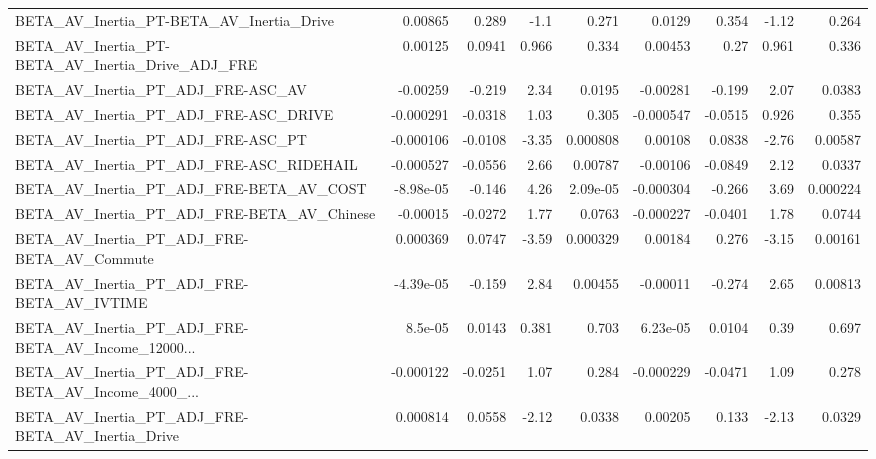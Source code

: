 \begin{tabular}{lrrrrrrrr}
BETA\_AV\_Inertia\_PT-BETA\_AV\_Inertia\_Drive           &     0.00865 &        0.289 &     -1.1 &    0.271 &     0.0129 &       0.354 &        -1.12 &         0.264 \\
BETA\_AV\_Inertia\_PT-BETA\_AV\_Inertia\_Drive\_ADJ\_FRE   &     0.00125 &       0.0941 &    0.966 &    0.334 &    0.00453 &        0.27 &        0.961 &         0.336 \\
BETA\_AV\_Inertia\_PT\_ADJ\_FRE-ASC\_AV                  &    -0.00259 &       -0.219 &     2.34 &   0.0195 &   -0.00281 &      -0.199 &         2.07 &        0.0383 \\
BETA\_AV\_Inertia\_PT\_ADJ\_FRE-ASC\_DRIVE               &   -0.000291 &      -0.0318 &     1.03 &    0.305 &  -0.000547 &     -0.0515 &        0.926 &         0.355 \\
BETA\_AV\_Inertia\_PT\_ADJ\_FRE-ASC\_PT                  &   -0.000106 &      -0.0108 &    -3.35 & 0.000808 &    0.00108 &      0.0838 &        -2.76 &       0.00587 \\
BETA\_AV\_Inertia\_PT\_ADJ\_FRE-ASC\_RIDEHAIL            &   -0.000527 &      -0.0556 &     2.66 &  0.00787 &   -0.00106 &     -0.0849 &         2.12 &        0.0337 \\
BETA\_AV\_Inertia\_PT\_ADJ\_FRE-BETA\_AV\_COST            &   -8.98e-05 &       -0.146 &     4.26 & 2.09e-05 &  -0.000304 &      -0.266 &         3.69 &      0.000224 \\
BETA\_AV\_Inertia\_PT\_ADJ\_FRE-BETA\_AV\_Chinese         &    -0.00015 &      -0.0272 &     1.77 &   0.0763 &  -0.000227 &     -0.0401 &         1.78 &        0.0744 \\
BETA\_AV\_Inertia\_PT\_ADJ\_FRE-BETA\_AV\_Commute         &    0.000369 &       0.0747 &    -3.59 & 0.000329 &    0.00184 &       0.276 &        -3.15 &       0.00161 \\
BETA\_AV\_Inertia\_PT\_ADJ\_FRE-BETA\_AV\_IVTIME          &   -4.39e-05 &       -0.159 &     2.84 &  0.00455 &   -0.00011 &      -0.274 &         2.65 &       0.00813 \\
BETA\_AV\_Inertia\_PT\_ADJ\_FRE-BETA\_AV\_Income\_12000... &     8.5e-05 &       0.0143 &    0.381 &    0.703 &   6.23e-05 &      0.0104 &         0.39 &         0.697 \\
BETA\_AV\_Inertia\_PT\_ADJ\_FRE-BETA\_AV\_Income\_4000\_... &   -0.000122 &      -0.0251 &     1.07 &    0.284 &  -0.000229 &     -0.0471 &         1.09 &         0.278 \\
BETA\_AV\_Inertia\_PT\_ADJ\_FRE-BETA\_AV\_Inertia\_Drive   &    0.000814 &       0.0558 &    -2.12 &   0.0338 &    0.00205 &       0.133 &        -2.13 &        0.0329 \\

\end{tabular}

